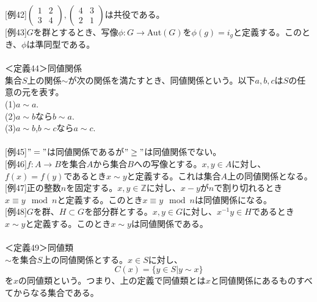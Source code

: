 \documentclass{jsarticle}
\begin{document}
\\
\hspace{5mm}[例42]\(\left(\begin{array}{cc}
1&2\\
3&4
\end{array}\right),\left(\begin{array}{cc}
4&3\\
2&1
\end{array}\right)\)は共役である。\\
\hspace{5mm}[例43]\(G\)を群とするとき、写像\(\phi:G\rightarrow\)Aut\((G)\)を\(\phi(g)=i_{g}\)と定義する。このとき、\(\phi\)は準同型である。\\
\\
＜定義44＞同値関係\\
集合\(S\)上の関係\(\sim\)が次の関係を満たすとき、同値関係という。以下\(a,b,c\)は\(S\)の任意の元を表す。\\
(1)\(a\sim a.\)\\
(2)\(a\sim b\)なら\(b\sim a.\)\\
(3)\(a\sim b\),\(b\sim c\)なら\(a\sim c.\)\\
\\
\hspace{5mm}[例45]\("="\)は同値関係であるが\("\geq"\)は同値関係でない。\\
\hspace{5mm}[例46]\(f:A\rightarrow B\)を集合\(A\)から集合\(B\)への写像とする。\(x,y\in A\)に対し、\(f(x)=f(y)\)であるとき\(x\sim y\)と定義する。これは集合\(A\)上の同値関係となる。\\
\hspace{5mm}[例47]正の整数\(n\)を固定する。\(x,y\in\mathbb{Z}\)に対し、\(x-y\)が\(n\)で割り切れるとき\(x\equiv y\mod n\)と定義する。このとき\(x\equiv y\mod n\)は同値関係になる。\\
\hspace{5mm}[例48]\(G\)を群、\(H\subset G\)を部分群とする。\(x,y\in G\)に対し、\(x^{-1}y\in H\)であるとき\(x\sim y\)と定義する。このとき\(x\sim y\)は同値関係である。\\
\\
＜定義49＞同値類\\
\(\sim\)を集合\(S\)上の同値関係とする。\(x\in S\)に対し、
\[C(x)=\{y\in S|y\sim x\}\]
を\(x\)の同値類という。つまり、上の定義で同値類とは\(x\)と同値関係にあるものすべてからなる集合である。
\end{document}

